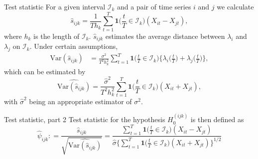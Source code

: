 \documentclass[10pt]{beamer}
\newcommand{\Var}{\mathrm{Var}}
\newcommand{\ind}{\boldsymbol{1}\Big( \frac{t}{T} \in \mathcal{I}_k \Big)} %
\newcommand{\indsmall}{\boldsymbol{1}\big( \frac{t}{T} \in \mathcal{I}_k \big)} %
\begin{document}
\begin{frame}[label = frame_teststatistic]{Test statistic}
For a given interval $\mathcal{I}_k$ and a pair of time series $i$ and $j$ we calculate
\begin{equation*}
\hat{s}_{ijk} = \frac{1}{T h_k} \sum\limits_{t=1}^T \ind (X_{it} -X_{jt}), 
\end{equation*}
where $h_k$ is the length of $\mathcal{I}_k$. \pause $\hat{s}_{ijk}$ estimates the average distance between $\lambda_i$ and $\lambda_j$ on $\mathcal{I}_k$. \pause Under certain assumptions, 
\begin{align*}
\Var(\hat{s}_{ijk})  & = \frac{\sigma^2}{T^2 h_k^2} \sum\limits_{t=1}^T \ind \Big\{ \lambda_i\Big(\frac{t}{T}\Big) + \lambda_j\Big(\frac{t}{T}\Big) \Big\},
\end{align*}\pause
which can be estimated by
\[ \widehat{\Var(\hat{s}_{ijk})} = \frac{\hat{\sigma}^2}{T^2 h_k^2} \sum\limits_{t=1}^T \ind (X_{it} + X_{jt} ), \]
with $\hat{\sigma}^2$ being an appropriate estimator of $\sigma^2$. \hyperlink{frame_sigma}{}

\end{frame}


\begin{frame}{Test statistic, part 2}
Test statistic for the hypothesis $H_0^{(ijk)}$ is then defined as
\begin{equation*}
\widehat{\psi}_{ijk} : = \frac{\hat{s}_{ijk}}{\sqrt{\widehat{\Var(\hat{s}_{ijk})} }}= \frac{\sum\nolimits_{t=1}^T \indsmall (X_{it} -X_{jt})}{\hat{\sigma} \big\{ \sum\nolimits_{t=1}^T \indsmall  (X_{it} + X_{jt} )\big\}^{1/2}}
\end{equation*}
\end{frame}
\end{document}

